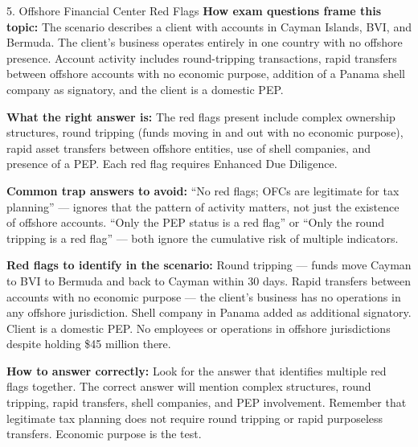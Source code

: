 \documentclass[11pt,a4paper]{beamer}
\begin{document}
	\begin{frame}{5. Offshore Financial Center Red Flags}
		\tiny
		\noindent\textbf{How exam questions frame this topic:} The scenario describes a client with accounts in Cayman Islands, BVI, and Bermuda. The client's business operates entirely in one country with no offshore presence. Account activity includes round-tripping transactions, rapid transfers between offshore accounts with no economic purpose, addition of a Panama shell company as signatory, and the client is a domestic PEP.
		
		\vspace{0.1cm}
		\noindent\textbf{What the right answer is:} The red flags present include complex ownership structures, round tripping (funds moving in and out with no economic purpose), rapid asset transfers between offshore entities, use of shell companies, and presence of a PEP. Each red flag requires Enhanced Due Diligence.
		
		\vspace{0.1cm}
		\noindent\textbf{Common trap answers to avoid:} “No red flags; OFCs are legitimate for tax planning” — ignores that the pattern of activity matters, not just the existence of offshore accounts. “Only the PEP status is a red flag” or “Only the round tripping is a red flag” — both ignore the cumulative risk of multiple indicators.
		
		\vspace{0.1cm}
		\noindent\textbf{Red flags to identify in the scenario:} Round tripping — funds move Cayman to BVI to Bermuda and back to Cayman within 30 days. Rapid transfers between accounts with no economic purpose — the client's business has no operations in any offshore jurisdiction. Shell company in Panama added as additional signatory. Client is a domestic PEP. No employees or operations in offshore jurisdictions despite holding \$45 million there.
		
		\vspace{0.1cm}
		\noindent\textbf{How to answer correctly:} Look for the answer that identifies multiple red flags together. The correct answer will mention complex structures, round tripping, rapid transfers, shell companies, and PEP involvement. Remember that legitimate tax planning does not require round tripping or rapid purposeless transfers. Economic purpose is the test.
	\end{frame}
	
\end{document}
